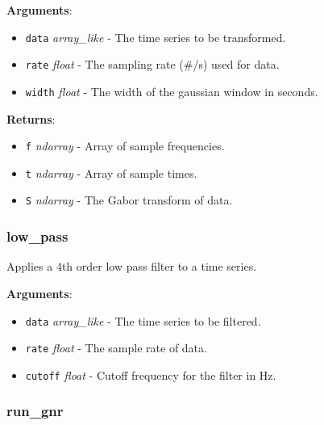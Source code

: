 \textbf{Arguments}:

\begin{itemize}
\tightlist
\item
  \texttt{data} \emph{array\_like} - The time series to be transformed.
\item
  \texttt{rate} \emph{float} - The sampling rate (\#/s) used for data.
\item
  \texttt{width} \emph{float} - The width of the gaussian window in
  seconds.
\end{itemize}

\textbf{Returns}:

\begin{itemize}
\tightlist
\item
  \texttt{f} \emph{ndarray} - Array of sample frequencies.
\item
  \texttt{t} \emph{ndarray} - Array of sample times.
\item
  \texttt{S} \emph{ndarray} - The Gabor transform of data.
\end{itemize}

\subsubsection{low\_pass}

\begin{Shaded}
\begin{Highlighting}[]
\end{Highlighting}
\end{Shaded}

Applies a 4th order low pass filter to a time series.

\textbf{Arguments}:

\begin{itemize}
\tightlist
\item
  \texttt{data} \emph{array\_like} - The time series to be filtered.
\item
  \texttt{rate} \emph{float} - The sample rate of data.
\item
  \texttt{cutoff} \emph{float} - Cutoff frequency for the filter in Hz.
\end{itemize}

\subsubsection{run\_gnr}

\begin{Shaded}
\begin{Highlighting}[]
\end{Highlighting}
\end{Shaded}

